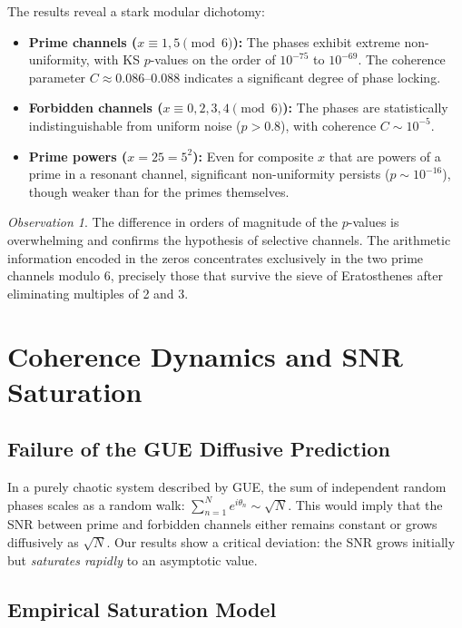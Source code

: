 \documentclass[12pt,a4paper]{article}
\theoremstyle{plain}
\theoremstyle{definition}
\theoremstyle{remark}
\newtheorem{observation}[theorem]{Observation}
\begin{document}
The results reveal a stark modular dichotomy:
\begin{itemize}
    \item \textbf{Prime channels (\(x \equiv 1,5 \pmod{6}\)):} The phases exhibit extreme non-uniformity, with KS \(p\)-values on the order of \(10^{-75}\) to \(10^{-69}\). The coherence parameter \(C \approx 0.086\)--\(0.088\) indicates a significant degree of phase locking.
    \item \textbf{Forbidden channels (\(x \equiv 0,2,3,4 \pmod{6}\)):} The phases are statistically indistinguishable from uniform noise (\(p > 0.8\)), with coherence \(C \sim 10^{-5}\).
    \item \textbf{Prime powers (\(x = 25 = 5^2\)):} Even for composite \(x\) that are powers of a prime in a resonant channel, significant non-uniformity persists (\(p \sim 10^{-16}\)), though weaker than for the primes themselves.
\end{itemize}

\begin{observation}
The difference in orders of magnitude of the \(p\)-values is overwhelming and confirms the hypothesis of selective channels. The arithmetic information encoded in the zeros concentrates exclusively in the two prime channels modulo 6, precisely those that survive the sieve of Eratosthenes after eliminating multiples of 2 and 3.
\end{observation}

\section{Coherence Dynamics and SNR Saturation}
\label{sec:snr}

\subsection{Failure of the GUE Diffusive Prediction}
In a purely chaotic system described by GUE, the sum of independent random phases scales as a random walk: \(\sum_{n=1}^N e^{i\theta_n} \sim \sqrt{N}\). This would imply that the SNR between prime and forbidden channels either remains constant or grows diffusively as \(\sqrt{N}\). Our results show a critical deviation: the SNR grows initially but \emph{saturates rapidly} to an asymptotic value.

\subsection{Empirical Saturation Model}
\label{subsec:saturation_model}
\end{document}
